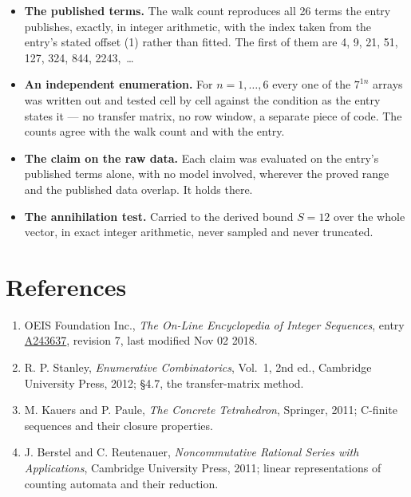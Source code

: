 \documentclass[11pt]{article}
\theoremstyle{definition}
\begin{document}
\begin{itemize}

\item {\bfseries The published terms.} The walk count reproduces all 26 terms the entry publishes, exactly, in integer arithmetic, with the index taken from the entry's stated offset (1) rather than fitted. The first of them are 4, 9, 21, 51, 127, 324, 844, 2243,~\dots

\item {\bfseries An independent enumeration.} For $n = 1,\dots,6$ every one of the $7^{1n}$ arrays was written out and tested cell by cell against the condition as the entry states it --- no transfer matrix, no row window, a separate piece of code. The counts agree with the walk count and with the entry.

\item {\bfseries The claim on the raw data.} Each claim was evaluated on the entry's published terms alone, with no model involved, wherever the proved range and the published data overlap. It holds there.

\item {\bfseries The annihilation test.} Carried to the derived bound $S = 12$ over the whole vector, in exact integer arithmetic, never sampled and never truncated.

\end{itemize}

\section{References}

\begin{enumerate}

\item OEIS Foundation Inc., \emph{The On-Line Encyclopedia of Integer Sequences}, entry \href{https://oeis.org/A243637}{A243637}, revision 7, last modified Nov 02 2018.

\item R. P. Stanley, \emph{Enumerative Combinatorics}, Vol.~1, 2nd ed., Cambridge University Press, 2012; \S4.7, the transfer-matrix method.

\item M. Kauers and P. Paule, \emph{The Concrete Tetrahedron}, Springer, 2011; C-finite sequences and their closure properties.

\item J. Berstel and C. Reutenauer, \emph{Noncommutative Rational Series with Applications}, Cambridge University Press, 2011; linear representations of counting automata and their reduction.

\end{enumerate}
\end{document}

